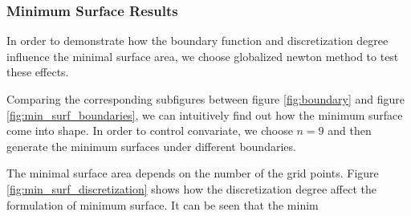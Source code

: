 \subsubsection{Minimum Surface Results}
In order to demonstrate how the boundary function and discretization degree influence the minimal surface area, we choose globalized newton method to test these effects.

Comparing the corresponding subfigures between figure \ref{fig:boundary} and figure \ref{fig:min_surf_boundaries}, we can intuitively find out how the minimum surface come into shape. In order to control convariate, we choose $n=9$ and then generate the minimum surfaces under different boundaries. 

The minimal surface area depends on the number of the grid points. Figure \ref{fig:min_surf_discretization} shows how the discretization degree affect the formulation of minimum surface. It can be seen that the minim
